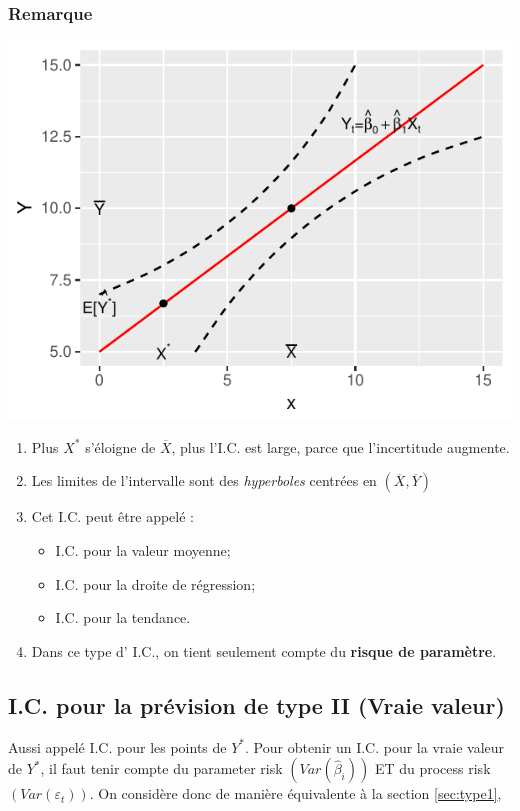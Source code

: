 \documentclass[11pt,french]{report}
\begin{document}
\subsubsection*{Remarque}

\includegraphics{notes_de_cours-021}

\begin{enumerate}
\item Plus $X^*$ s'éloigne de $\overline{X}$, plus l'I.C. est large, parce que l'incertitude augmente.
\item Les limites de l'intervalle sont des \emph{hyperboles} centrées en $(\overline{X}, \overline{Y})$
\item Cet I.C. peut être appelé :
     \begin{itemize}
     \item I.C. pour la valeur moyenne;
     \item I.C. pour la droite de régression;
     \item I.C. pour la tendance.
     \end{itemize}
\item Dans ce type d' I.C., on tient seulement compte du \textbf{risque de paramètre}.
\end{enumerate}

\subsection{I.C. pour la prévision de type II (Vraie valeur)}
\label{sec:type2}
Aussi appelé I.C. pour les points de $Y^*$.
\bigskip
Pour obtenir un I.C. pour la vraie valeur de $Y^*$, il faut tenir compte du parameter risk $(Var(\hat{\beta}_i))$ ET du process risk $(Var(\varepsilon_t))$. On considère donc de manière équivalente à la section \ref{sec:type1},
\end{document}
